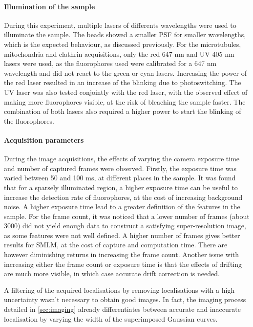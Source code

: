 \paragraph{Illumination of the sample}
During this experiment, multiple lasers of differents wavelengths were used to illuminate the sample. The beads showed a smaller PSF for smaller wavelengths, which is the expected behaviour, as discussed previously. For the microtubules, mitochondria and clathrin acquisitions, only the red 647 nm and UV 405 nm lasers were used, as the fluorophores used were calibrated for a 647 nm wavelength and did not react to the green or cyan lasers. Increasing the power of the red laser resulted in an increase of the blinking due to photoswitching. The UV laser was also tested conjointly with the red laser, with the observed effect of making more fluorophores visible, at the risk of bleaching the sample faster. The combination of both lasers also required a higher power to start the blinking of the fluorophores.

\paragraph{Acquisition parameters}
During the image acquisitions, the effects of varying the camera exposure time and number of captured frames were observed. Firstly, the exposure time was varied between 50 and 100 ms, at different places in the sample. It was found that for a sparsely illuminated region, a higher exposure time can be useful to increase the detection rate of fluorophores, at the cost of increasing background noise. A higher exposure time lead to a greater definition of the features in the sample. For the frame count, it was noticed that a lower number of frames (about 3000) did not yield enough data to construct a satisfying super-resolution image, as some features were not well defined. A higher number of frames gives better results for SMLM, at the cost of capture and computation time. There are however diminishing returns in increasing the frame count. Another issue with increasing either the frame count or exposure time is that the effects of drifting are much more visible, in which case accurate drift correction is needed.

A filtering of the acquired localisations by removing localisations with a high uncertainty wasn't necessary to obtain good images.
In fact, the imaging process detailed in \autoref{sec:imaging} already differentiates between accurate and inaccurate localisation by varying the width of the superimposed Gaussian curves.

